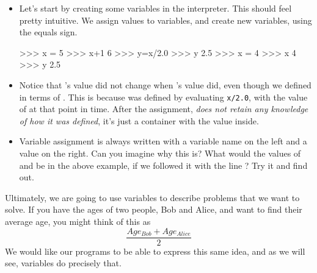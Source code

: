 \begin{itemize}
    \item Let's start by creating some variables in the interpreter.
        This should feel pretty intuitive.
        We assign values to variables, and create new variables, using the equals sign.
\begin{codeblock}
>>> x = 5
>>> x+1
6
>>> y=x/2.0
>>> y
2.5
>>> x = 4
>>> x
4
>>> y
2.5
\end{codeblock}
    \item Notice that 's value did not change when 's value did, even though we defined  in terms of .
        This is because  was defined by evaluating \texttt{x/2.0}, with the value of  at that point in time.
        After the assignment,  \textit{does not retain any knowledge of how it was defined}, it's just a container with the value  inside.
    \item Variable assignment is always written with a variable name on the left and a value on the right.
        Can you imagine why this is?
        What would the values of  and  be in the above example, if we followed it with the line ?
        Try it and find out.
\end{itemize}

Ultimately, we are going to use variables to describe problems that we want to solve.
If you have the ages of two people, Bob and Alice, and want to find their average age, you might think of this as
$$\frac{Age_{Bob} + Age_{Alice}}{2}$$
We would like our programs to be able to express this same idea, and as we will see, variables do precisely that.

